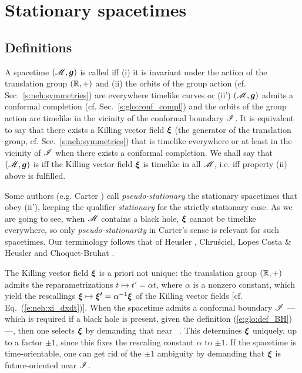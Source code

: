 \section{Stationary spacetimes} \label{s:sta:sta_st}

\subsection{Definitions} \label{s:sta:def_station}

\begin{greybox}
A spacetime $(\mathscr{M},\bm{g})$ is called 
iff (i) it is invariant under
the action of the translation group $(\mathbb{R},+)$ and (ii) the orbits of
the group action (cf. Sec.~\ref{s:neh:symmetries})
are everywhere timelike curves or (ii') $(\mathscr{M},\bm{g})$
admits a conformal completion (cf. Sec.~\ref{s:glo:conf_compl})
and the orbits of the group action are timelike in the vicinity of
the conformal boundary $\mathscr{I}$.
It is equivalent to say that there exists a Killing vector field
$\bm{\xi}$ (the generator of the translation group, cf. Sec.~\ref{s:neh:symmetries}) that is
timelike everywhere or at least in the vicinity of $\mathscr{I}$ when there exists a conformal
completion. We shall say that $(\mathscr{M},\bm{g})$ is  iff the Killing vector field $\bm{\xi}$ is timelike in all $\mathscr{M}$,
i.e. iff property (ii) above is fulfilled.
\end{greybox}

\begin{remark} \label{r:sta:pseudo-stationary}
Some authors (e.g. Carter \cite{Carte73b}) call
\emph{pseudo-stationary} the stationary spacetimes
that obey (ii'), keeping the qualifier
\emph{stationary} for the strictly stationary case.
As we are going to see, when $\mathscr{M}$
contains a black hole, $\bm{\xi}$ cannot be timelike everywhere,
so only \emph{pseudo-stationarity} in Carter's sense is relevant for such spacetimes.
Our terminology follows that of
Heusler \cite{Heusl96},
Chru\'sciel, Lopes Costa \& Heusler \cite{ChrusLH12}
and Choquet-Bruhat \cite{Choqu09}.
\end{remark}

The Killing vector field $\bm{\xi}$ is a priori not unique: the translation group $(\mathbb{R},+)$
admits the reparametrizations
$t\mapsto t' = \alpha t$, where $\alpha$ is a nonzero constant, which yield
the rescallings $\bm{\xi} \mapsto \bm{\xi'} = \alpha^{-1} \bm{\xi}$
of the Killing vector fields [cf. Eq.~(\ref{e:neh:xi_dxdt})]. When the
spacetime admits a conformal boundary $\mathscr{I}$ --- which is required if a black hole
is present, given the definition (\ref{e:glo:def_BH}) ---, then
one selects $\bm{\xi}$ by demanding that
\be \label{e:sta:xi_scri}
    \w{\xi}\cdot\w{\xi}  \quad \mbox{near\ } \scri .
\ee
This determines $\bm{\xi}$ uniquely, up to a factor $\pm 1$, since this fixes
the rescaling constant $\alpha$ to $\pm 1$. If the spacetime is time-orientable, one
can get rid of the $\pm 1$ ambiguity by demanding that $\bm{\xi}$
is future-oriented near $\mathscr{I}$.

